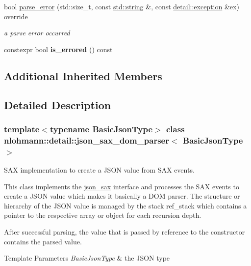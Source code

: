 \begin{DoxyCompactItemize}
bool \mbox{\hyperlink{classnlohmann_1_1detail_1_1json__sax__dom__parser_a4a9299efaa11deed7d5d1758de2602f8}{parse\+\_\+error}} (std\+::size\+\_\+t, const \mbox{\hyperlink{namespacenlohmann_1_1detail_a1ed8fc6239da25abcaf681d30ace4985ab45cffe084dd3d20d928bee85e7b0f21}{std\+::string}} \&, const \mbox{\hyperlink{classnlohmann_1_1detail_1_1exception}{detail\+::exception}} \&ex) override
\begin{DoxyCompactList}\small\item\em a parse error occurred \end{DoxyCompactList}\item 
\mbox{\label{classnlohmann_1_1detail_1_1json__sax__dom__parser_ad1b9f3681fadbbb2e0127f5c8a99c662}} 
constexpr bool {\bfseries is\+\_\+errored} () const
\end{DoxyCompactItemize}
\subsection*{Additional Inherited Members}


\subsection{Detailed Description}
\subsubsection*{template$<$typename Basic\+Json\+Type$>$\newline
class nlohmann\+::detail\+::json\+\_\+sax\+\_\+dom\+\_\+parser$<$ Basic\+Json\+Type $>$}

S\+AX implementation to create a J\+S\+ON value from S\+AX events. 

This class implements the \mbox{\hyperlink{structnlohmann_1_1json__sax}{json\+\_\+sax}} interface and processes the S\+AX events to create a J\+S\+ON value which makes it basically a D\+OM parser. The structure or hierarchy of the J\+S\+ON value is managed by the stack {\ttfamily ref\+\_\+stack} which contains a pointer to the respective array or object for each recursion depth.

After successful parsing, the value that is passed by reference to the constructor contains the parsed value.


\begin{DoxyTemplParams}{Template Parameters}
{\em Basic\+Json\+Type} & the J\+S\+ON type \\
\hline
\end{DoxyTemplParams}


